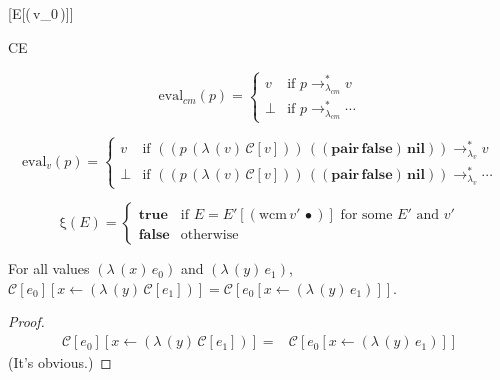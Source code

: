 \documentclass[ms,electronic,twosidetoc,letterpaper,chaptercenter,parttop]{byumsphd}
\newcommand{\false}{\mathbf{false}}
\newcommand{\nil}{\mathbf{nil}}
\newcommand{\pair}[2]{((\mathbf{pair}\,#1)\,#2)}
\newcommand{\lvrrs}{\rightarrow_{\lambda_v}^{*}}
\newcommand{\cmrrs}{\rightarrow_{\lambda_{cm}}^{*}}
\newcommand{\C}[1]{\mathcal{C}[#1]}
\newcommand{\abs}[2]{(\lambda\,(#1)\,#2)}
\newcommand{\app}[2]{(#1\,#2)}
\newcommand{\wcm}[2]{(\mathrm{wcm}\,#1\,#2)}
\newcommand{\hole}{\bullet}
\begin{document}
\begin{schemedefn}{\C{E[\wcm{v_0}{\hole}]}}
\begin{schemedisplay}
CE
\end{schemedisplay}
\end{schemedefn}

\begin{defn}
\[
\mathrm{eval}_{cm}(p)=\begin{cases}
v     &\text{if $p\cmrrs v$}\\
\perp &\text{if $p\cmrrs\cdots$}
\end{cases}
\]
\end{defn}

\begin{defn}
\[
\mathrm{eval}_{v}(p)=\begin{cases}
v     &\text{if $\app{\app{p}{\abs{v}{\C{v}}}}{\pair{\false}{\nil}}\lvrrs v$}\\
\perp &\text{if $\app{\app{p}{\abs{v}{\C{v}}}}{\pair{\false}{\nil}}\lvrrs\cdots$}
\end{cases}
\]
\end{defn}







\begin{defn}
\[
\mathrm{\xi}(E)=\begin{cases}
\mathbf{true} &\text{if $E=E'[\wcm{v'}{\hole}]$ for some $E'$ and $v'$}\\
\mathbf{false} &\text{otherwise}
\end{cases}
\]
\end{defn}

\begin{lemma}
\label{collapse}
For all values $\abs{x}{e_0}$ and $\abs{y}{e_1}$, $\C{e_0}[x\leftarrow \abs{y}{\C{e_1}}]=\C{e_0[x\leftarrow \abs{y}{e_1}]}$.
\end{lemma}

\begin{proof}
\begin{align*}
\C{e_0}[x\leftarrow \abs{y}{\C{e_1}}] = &\C{e_0[x\leftarrow \abs{y}{e_1}}]
\end{align*}
(It's obvious.)
\end{proof}
\end{document}
